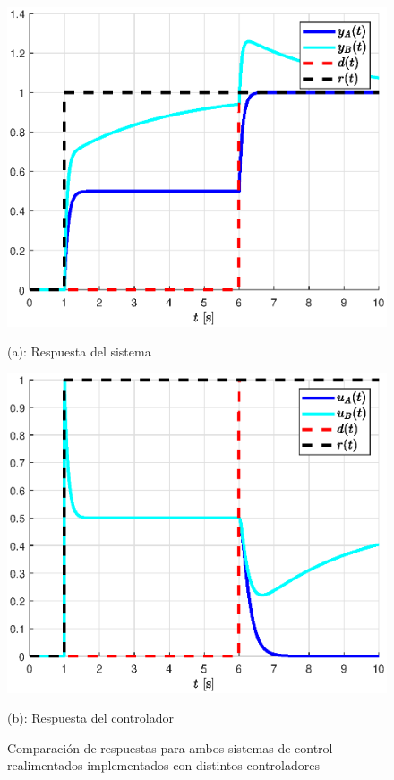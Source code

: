 \begin{figure}[!h]
    \centering
    \begin{minipage}{0.45\linewidth}
        \includegraphics[width=\linewidth]{figs/fig7.eps}
        \caption*{(a): Respuesta del sistema}
    \end{minipage}
    \begin{minipage}{0.45\linewidth}
        \includegraphics[width=\linewidth]{figs/fig6.eps}
        \caption*{(b): Respuesta del controlador}
    \end{minipage}
    \caption{Comparación de respuestas para ambos sistemas de control realimentados implementados con distintos controladores}
    \label{fig5}
\end{figure}

